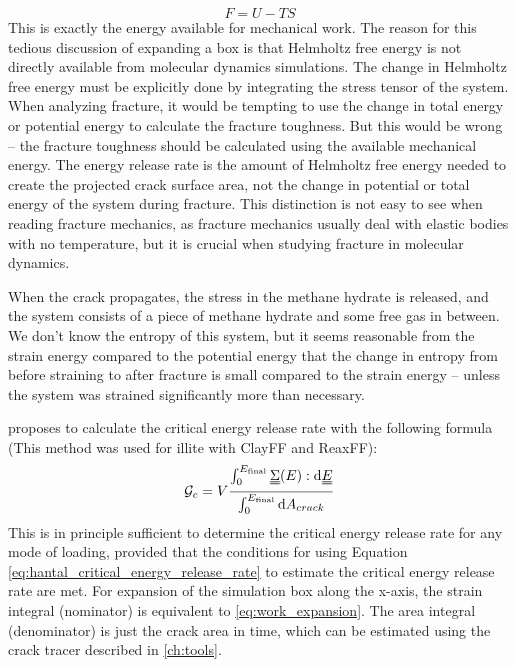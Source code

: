 \begin{equation}
	F = U - TS
\end{equation}
%
This is exactly the energy available for mechanical work. The reason for this tedious discussion of expanding a box is that Helmholtz free energy is not directly available from molecular dynamics simulations. The change in Helmholtz free energy must be explicitly done by integrating the stress tensor of the system. When analyzing fracture, it would be tempting to use the change in total energy or potential energy to calculate the fracture toughness. But this would be wrong -- the fracture toughness should be calculated using the available mechanical energy. The energy release rate is the amount of Helmholtz free energy needed to create the projected crack surface area, not the change in potential or total energy of the system during fracture. This distinction is not easy to see when reading fracture mechanics, as fracture mechanics usually deal with elastic bodies with no temperature, but it is crucial when studying fracture in molecular dynamics.

When the crack propagates, the stress in the methane hydrate is released, and the system consists of a piece of methane hydrate and some free gas in between. We don't know the entropy of this system, but it seems reasonable from the strain energy compared to the potential energy that the change in entropy from before straining to after fracture is small compared to the strain energy -- unless the system was strained significantly more than necessary.


\citet{Hantal2014} proposes to calculate the critical energy release rate with the following formula (This method was used for illite with ClayFF and ReaxFF):
\begin{equation}
	\mathcal{G}_c = V \frac{\int_0^{E_{\text{final}}}\uuline{\Sigma}(E) : \dd \uuline{E}}{\int_0^{E_{\text{final}}} \dd A_{crack}}
	\label{eq:hantal_critical_energy_release_rate}
\end{equation}
%
This is in principle sufficient to determine the critical energy release rate for any mode of loading, provided that the conditions for using Equation \ref{eq:hantal_critical_energy_release_rate} to estimate the critical energy release rate are met. 
For expansion of the simulation box along the x-axis, the strain integral (nominator) is equivalent to \ref{eq:work_expansion}. The area integral (denominator) is just the crack area in time, which can be estimated using the crack tracer described in \ref{ch:tools}.

